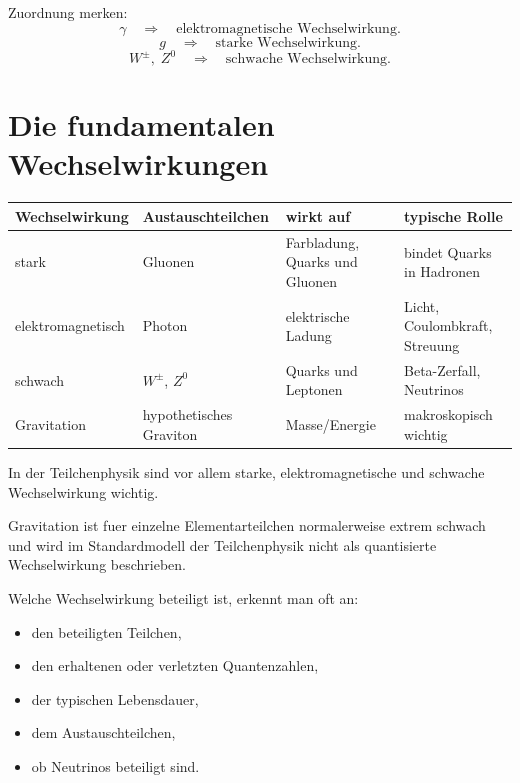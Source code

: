 \begin{examtipbox}
Zuordnung merken:
\[
    \gamma
    \quad\Rightarrow\quad
    \text{elektromagnetische Wechselwirkung}.
\]
\[
    g
    \quad\Rightarrow\quad
    \text{starke Wechselwirkung}.
\]
\[
    W^\pm,\;Z^0
    \quad\Rightarrow\quad
    \text{schwache Wechselwirkung}.
\]
\end{examtipbox}

\section{Die fundamentalen Wechselwirkungen}

\begin{center}
\begin{tabular}{|p{3.3cm}|p{3.4cm}|p{4.2cm}|p{3.6cm}|}
\hline
Wechselwirkung & Austauschteilchen & wirkt auf & typische Rolle \\
\hline
stark & Gluonen & Farbladung, Quarks und Gluonen & bindet Quarks in Hadronen \\
\hline
elektromagnetisch & Photon & elektrische Ladung & Licht, Coulombkraft, Streuung \\
\hline
schwach & $W^\pm$, $Z^0$ & Quarks und Leptonen & Beta-Zerfall, Neutrinos \\
\hline
Gravitation & hypothetisches Graviton & Masse/Energie & makroskopisch wichtig \\
\hline
\end{tabular}
\end{center}

\begin{conceptbox}
In der Teilchenphysik sind vor allem starke, elektromagnetische und schwache
Wechselwirkung wichtig.

Gravitation ist fuer einzelne Elementarteilchen normalerweise extrem schwach und
wird im Standardmodell der Teilchenphysik nicht als quantisierte Wechselwirkung
beschrieben.
\end{conceptbox}

\begin{examtipbox}
Welche Wechselwirkung beteiligt ist, erkennt man oft an:
\begin{itemize}
    \item den beteiligten Teilchen,
    \item den erhaltenen oder verletzten Quantenzahlen,
    \item der typischen Lebensdauer,
    \item dem Austauschteilchen,
    \item ob Neutrinos beteiligt sind.
\end{itemize}
\end{examtipbox}

